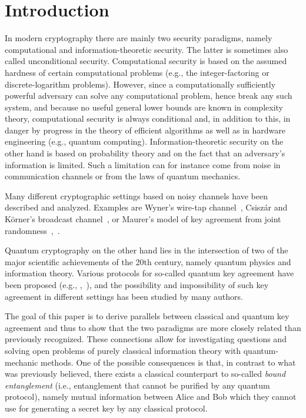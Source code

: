 \documentclass{article}
\begin{document}
\newpage

\section{Introduction}

In modern cryptography there are mainly two security paradigms, namely 
computational and information-theoretic security. The latter is sometimes also 
called unconditional security. Computational security is based on the 
assumed hardness of certain computational problems (e.g., the integer-factoring
or  dis\-crete-logarithm problems). However, since a computationally 
sufficiently powerful adversary can solve any computational
 problem, hence break any 
such system, and because no useful general lower bounds are known in complexity 
theory, computational
 security is always conditional and, in addition to this, in danger by  progress
in the theory of efficient algorithms as well as in hardware engineering 
(e.g., quantum computing). 
Information-theoretic security on the other hand is based on probability 
theory and on the fact that an adversary's information is limited.
Such a limitation can for instance come from noise in communication 
channels or from the laws of quantum mechanics. 

Many different cryptographic settings 
based on  noisy channels have been 
described and analyzed. Examples are  Wyner's wire-tap channel~\cite{wyner75},
Csisz\'ar and K\"orner's broadcast channel~\cite{csikor78}, or 
Maurer's model of  key agreement from joint randomness~\cite{ka},\,
 \cite{ittrans}. 


Quantum cryptography on the other hand lies in the intersection of two of the 
major scientific achievements of the 20th century, namely quantum physics and 
information theory. Various protocols for so-called quantum
key agreement have been proposed  (e.g., \cite{BB84},\, \cite{ekert}), 
and
the possibility and impossibility of 
such key agreement in different settings has been 
studied by many authors. 



The goal of this paper is to derive parallels between classical and 
quantum key agreement
and thus to show that the two paradigms are 
more closely related  than previously recognized.
These connections allow for  investigating questions and  solving
open problems of purely classical information theory with quantum-mechanic
methods. 
One of the possible consequences is that, in contrast to what was 
previously believed, there exists a classical counterpart to so-called
{\em bound entanglement\/} (i.e., entanglement that cannot be purified by any quantum
protocol), namely mutual  information between Alice and Bob 
which they cannot use for generating a secret key by any classical protocol.
\end{document}
